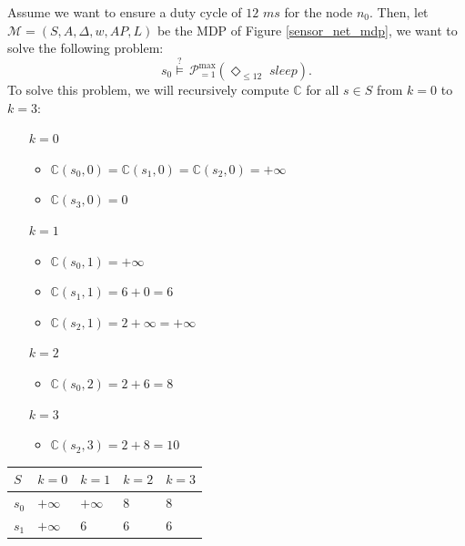 \begin{example}
Assume we want to ensure a duty cycle of $12$ $ms$ for the node $n_0$. Then, let $\mathcal{M}=(S, A, \Delta, w, AP, L)$ be the MDP of Figure \ref{sensor_net_mdp}, we want to solve the following \SPG{} problem:
\[
  s_0 \overset{?}{\models} \, \mathcal{P}^{\max}_{=1}(\Diamond_{\leq 12} \; \textit{sleep}).
\]
To solve this problem, we will recursively compute $\mathbb{C}$ for all $s \in S$ from $k=0$ to $k=3$:
\begin{minipage}{0.5\linewidth}
    \begin{itemize}
      \item[$k=0$] \begin{itemize}
[label=\raisebox{0.25ex}{\tiny$\bullet$}]        \item $\mathbb{C}(s_0, 0) = \mathbb{C}(s_1, 0) = \mathbb{C}(s_2, 0) = +\infty$
        \item $\mathbb{C}(s_3, 0) = 0$
      \end{itemize}
      \item[$k=1$]
        \begin{itemize}
[label=\raisebox{0.25ex}{\tiny$\bullet$}]          \item $\mathbb{C}(s_0, 1) = +\infty$
          \item $\mathbb{C}(s_1, 1) = 6 + 0 = 6$
          \item $\mathbb{C}(s_2, 1) = 2 + \infty = +\infty$
        \end{itemize}
      \item[$k=2$]
        \begin{itemize}
[label=\raisebox{0.25ex}{\tiny$\bullet$}]          \item $\mathbb{C}(s_0, 2) = 2 + 6 = 8$
        \end{itemize}
      \item[$k=3$]
        \begin{itemize}
[label=\raisebox{0.25ex}{\tiny$\bullet$}]          \item $\mathbb{C}(s_2, 3) = 2 + 8 = 10$
        \end{itemize}
    \end{itemize}
\end{minipage}
\begin{minipage}{0.5\linewidth}
\centering
\begin{tabular}{l|llll}
$S$ & $k=0$     & $k=1$     & $k=2$     & $k=3$ \\ \hline
$s_0$  & $+\infty$ & $+\infty$ & 8         & 8     \\
$s_1$  & $+\infty$ & 6         & 6         & 6     \\

\end{tabular}
\end{minipage}
\end{example}
